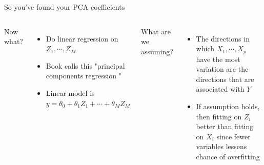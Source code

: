 \documentclass[aspectratio=169,usenames,dvipsnames]{beamer}
\newcommand{\InstructorList}[1]{
\begin{itemize}
	\color{orange}
	#1
\end{itemize}
}
\begin{document}
\begin{frame}[t]{So you've found your PCA coefficients}

\begin{columns}
\centering
Now what?

\InstructorList{
\item Do linear regression on $Z_1,\cdots,Z_M$
\item Book calls this "principal components regression "
\item Linear model is $y = \theta_0 + \theta_1 Z_1 + \cdots + \theta_M Z_M$
}
\centering
What are we assuming?

\InstructorList{
\item The directions in which $X_1,\cdots, X_p$ have the most variation are the directions that are associated with $Y$
\item If assumption holds, then fitting on $Z_i$ better than fitting on $X_i$ since fewer variables lessens chance of overfitting
}

\end{columns}

\end{frame}
\end{document}
